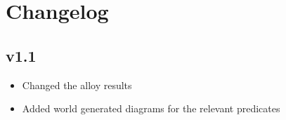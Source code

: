 \chapter{Changelog}

\section{v1.1}
\begin{itemize}
	\item Changed the alloy results 
	\item Added world generated diagrams for the relevant predicates
\end{itemize}